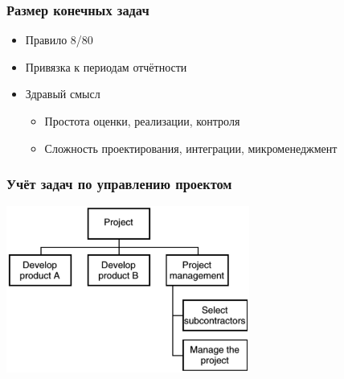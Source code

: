 \documentclass{../../slides-style}
\begin{document}
    \begin{frame}
        \frametitle{Размер конечных задач}
        \begin{itemize}
            \item Правило 8/80
            \item Привязка к периодам отчётности
            \item Здравый смысл
            \begin{itemize}
                \item Простота оценки, реализации, контроля
                \item Сложность проектирования, интеграции, микроменеджмент
            \end{itemize} 
        \end{itemize}
    \end{frame}

    \begin{frame}
        \frametitle{Учёт задач по управлению проектом}
        \begin{center}
            \includegraphics[width=0.6\textwidth]{wbsProjectManagementTasks.png}
        \end{center}
    \end{frame}
\end{document}
